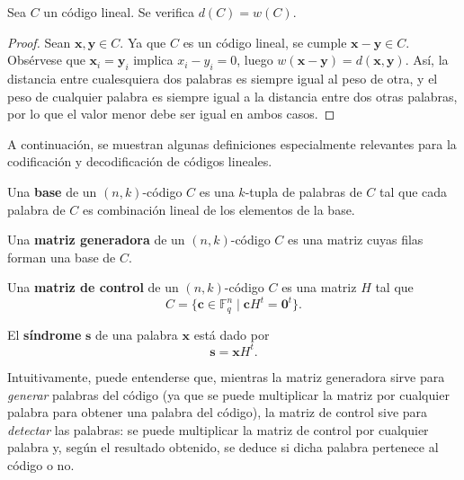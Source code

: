 \begin{theorem}
	Sea $C$ un código lineal. Se verifica $d(C) = w(C)$.
\end{theorem}

\begin{proof}
	Sean $\textbf{x}, \textbf{y} \in C$. Ya que $C$ es un código lineal, se cumple $\textbf{x} - \textbf{y} \in C$. Obsérvese que $\textbf{x}_i = \textbf{y}_i$ implica $x_i - y_i = 0$, luego $w(\textbf{x} - \textbf{y}) = d(\textbf{x}, \textbf{y})$. Así, la distancia entre cualesquiera dos palabras es siempre igual al peso de otra, y el peso de cualquier palabra es siempre igual a la distancia entre dos otras palabras, por lo que el valor menor debe ser igual en ambos casos.
\end{proof}

A continuación, se muestran algunas definiciones especialmente relevantes para la codificación y decodificación de códigos lineales.

\begin{definition}
	Una \textbf{base} de un $(n, k)$-código $C$ es una $k$-tupla de palabras de $C$ tal que cada palabra de $C$ es combinación lineal de los elementos de la base.
\end{definition}

\begin{definition}
	Una \textbf{matriz generadora} de un $(n, k)$-código $C$ es una matriz cuyas filas forman una base de $C$.
\end{definition}

\begin{definition}
	Una \textbf{matriz de control} de un $(n, k)$-código $C$ es una matriz $H$ tal que
	\[C = \{\textbf{c} \in \mathbb{F}_q^n \mid \textbf{c}H^t = \textbf{0}^t\}.\]
\end{definition}

\begin{definition}
	El \textbf{síndrome} $\textbf{s}$ de una palabra $\textbf{x}$ está dado por
	\[
		\textbf{s} = \textbf{x}H^t.
	\]
\end{definition}

Intuitivamente, puede entenderse que, mientras la matriz generadora sirve para \textit{generar} palabras del código (ya que se puede multiplicar la matriz por cualquier palabra para obtener una palabra del código), la matriz de control sive para \textit{detectar} las palabras: se puede multiplicar la matriz de control por cualquier palabra y, según el resultado obtenido, se deduce si dicha palabra pertenece al código o no.

